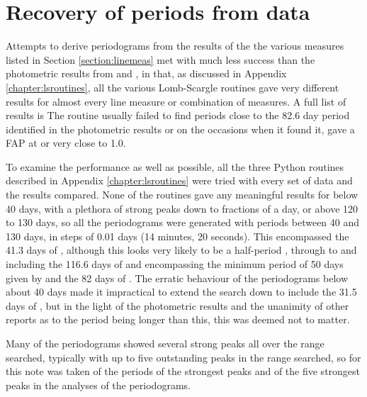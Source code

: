 \section{Recovery of periods from {\harps} data}
\protect\label{section:harpsper}

Attempts to derive periodograms from the results of the the various measures listed in Section \ref{section:linemeas}
met with much less success than the photometric results from {\asas} and {\hst}, in that, as discussed in Appendix
\ref{chapter:lsroutines}, all the various Lomb-Scargle routines gave very different results for almost every line
measure or combination of measures. A full list of results is  The {\numrecs} routine usually failed to find periods close to the 82.6 day period identified
in the photometric results or on the occasions when it found it, gave a FAP at or very close to 1.0.

To examine the performance as well as possible, all the three Python routines described in Appendix
\ref{chapter:lsroutines} were tried with every set of data and the results compared. None of the routines gave any
meaningful results for  below 40 days, with a plethora of strong peaks down to fractions of a day,
or above 120 to 130 days, so all the periodograms were generated with periods between 40 and 130 days, in steps of 0.01
days (14 minutes, 20 seconds). This encompassed the 41.3 days of \citet{benedict93}, although this looks very likely to
be a half-period , through to and including the 116.6 days of \citet[Table
3]{suarezmascareno15} and encompassing the minimum period of 50 days given by \citet{kurster99} and the 82 days of
\citealt{benedict92,benedict98,kiraga07}. The erratic behaviour of the periodograms below about 40 days made it
impractical to extend the search down to include the 31.5 days of \citet{guinan96}, but in the light of the photometric
results and the unanimity of other reports as to the period being longer than this, this was deemed not to matter.

Many of the periodograms showed several strong peaks all over the range searched, typically with up to five outstanding
peaks in the range searched, so for this {\paperorthesis} note was taken of the periods of the strongest peaks and of
the five strongest peaks in the analyses of the periodograms.

